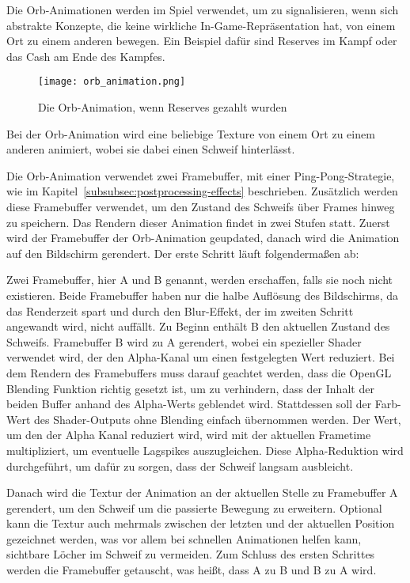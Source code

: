 Die Orb-Animationen werden im Spiel verwendet, um zu signalisieren, wenn sich abstrakte Konzepte, die keine wirkliche
In-Game-Repräsentation hat, von einem Ort zu einem anderen bewegen.
Ein Beispiel dafür sind Reserves im Kampf oder das Cash am Ende des Kampfes.

\begin{figure}[H]
    \centering
    \texttt{[image: orb\_animation.png]}
    \caption{Die Orb-Animation, wenn Reserves gezahlt wurden}
\end{figure}

Bei der Orb-Animation wird eine beliebige Texture von einem Ort zu einem anderen animiert, wobei sie dabei einen Schweif
hinterlässt.

Die Orb-Animation verwendet zwei Framebuffer, mit einer Ping-Pong-Strategie, wie im
Kapitel~\ref{subsubsec:postprocessing-effects} beschrieben.
Zusätzlich werden diese Framebuffer verwendet, um den Zustand des Schweifs über Frames hinweg zu speichern.
Das Rendern dieser Animation findet in zwei Stufen statt.
Zuerst wird der Framebuffer der Orb-Animation geupdated, danach wird die Animation auf den Bildschirm gerendert.
Der erste Schritt läuft folgendermaßen ab:

Zwei Framebuffer, hier A und B genannt, werden erschaffen, falls sie noch nicht existieren.
Beide Framebuffer haben nur die halbe Auflösung des Bildschirms, da das Renderzeit spart und durch den Blur-Effekt, der
im zweiten Schritt angewandt wird, nicht auffällt.
Zu Beginn enthält B den aktuellen Zustand des Schweifs.
Framebuffer B wird zu A gerendert, wobei ein spezieller Shader verwendet wird, der den Alpha-Kanal um einen festgelegten
Wert reduziert.
Bei dem Rendern des Framebuffers muss darauf geachtet werden, dass die OpenGL Blending Funktion richtig gesetzt ist,
um zu verhindern, dass der Inhalt der beiden Buffer anhand des Alpha-Werts geblendet wird.
Stattdessen soll der Farb-Wert des Shader-Outputs ohne Blending einfach übernommen werden.
Der Wert, um den der Alpha Kanal reduziert wird, wird mit der aktuellen Frametime multipliziert, um eventuelle
Lagspikes auszugleichen.
Diese Alpha-Reduktion wird durchgeführt, um dafür zu sorgen, dass der Schweif langsam ausbleicht.

Danach wird die Textur der Animation an der aktuellen Stelle zu Framebuffer A gerendert, um den Schweif um die passierte
Bewegung zu erweitern.
Optional kann die Textur auch mehrmals zwischen der letzten und der aktuellen Position gezeichnet werden, was vor allem
bei schnellen Animationen helfen kann, sichtbare Löcher im Schweif zu vermeiden.
Zum Schluss des ersten Schrittes werden die Framebuffer getauscht, was heißt, dass A zu B und B zu A wird.

